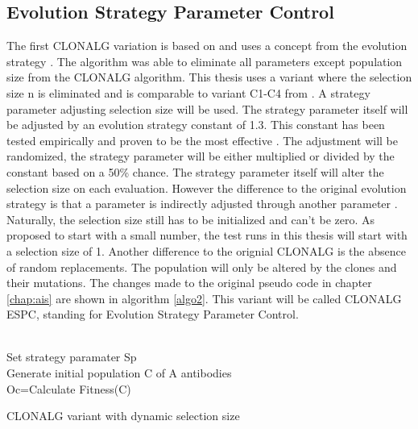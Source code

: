 \subsection{Evolution Strategy Parameter Control}
The first CLONALG variation is based on \cite{Garret04} and uses a concept from the evolution strategy \cite{evolution}. The algorithm was able to eliminate all parameters except population size from the CLONALG algorithm. This thesis uses a variant where the selection size n is eliminated and is comparable to variant C1-C4 from \cite{Garret04}. A strategy parameter adjusting selection size will be used. The strategy parameter itself will be adjusted by an evolution strategy constant of 1.3. This constant has been tested empirically and proven to be the most effective \cite{Garret04}. The adjustment will be randomized, the strategy parameter will be either multiplied or divided by the constant based on a 50\% chance. The strategy parameter itself will alter the selection size on each evaluation. However the difference to the original evolution strategy is that a parameter is indirectly adjusted through another parameter \cite{Garret04}. Naturally, the selection size still has to be initialized and can't be zero. As \cite{Garret04} proposed to start with a small number, the test runs in this thesis will start with a selection size of 1. Another difference to the orignial CLONALG is the absence of random replacements. The population will only be altered by the clones and their mutations. The changes made to the original pseudo code in chapter \ref{chap:ais} are shown in algorithm \ref{algo2}. This variant will be called CLONALG ESPC, standing for Evolution Strategy Parameter Control.\\\\
\begin{algorithm}[H]
	Set strategy paramater Sp\\
	Generate initial population C of A antibodies\\
	Oc=Calculate Fitness(C)\\
	\caption{CLONALG variant with dynamic selection size}
	\label{algo2}
\end{algorithm}
